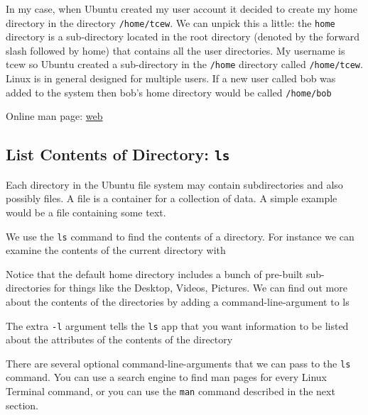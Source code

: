 In my case, when Ubuntu created my user account it decided to create my home directory in the directory \texttt{/home/tcew}. We can unpick this a little: the \texttt{home} directory is a sub-directory located in the root directory (denoted by the forward slash followed by home) that contains all the user directories. My username is tcew so Ubuntu created a sub-directory in the \texttt{/home} directory called \texttt{/home/tcew}. Linux is in general designed for multiple users. If a new user called bob was added to the system then bob's home directory would be called \texttt{/home/bob}

Online man page: \href{http://manpages.ubuntu.com/manpages/trusty/man1/pwd.1posix.html}{web}

\FloatBarrier

\subsection{List Contents of Directory: \texttt{ls}}

Each directory in the Ubuntu file system may contain subdirectories and also possibly files. A file is a container for a collection of data. A simple example would be a file containing some text.

We use the \texttt{ls} command to find the contents of a directory. For instance we can examine the contents of the current directory  with



Notice that the default home directory includes a bunch of pre-built sub-directories for things like the Desktop, Videos, Pictures. We can find out more about the contents of the directories by adding a command-line-argument to ls


The extra \texttt{-l} argument tells the \texttt{ls} app that you want information to be listed about the attributes of the contents of the directory


There are several optional command-line-arguments that we can pass to the \texttt{ls} command. You can use a search engine to find man pages for every Linux Terminal command, or you can use the \texttt{man} command described in the next section.

